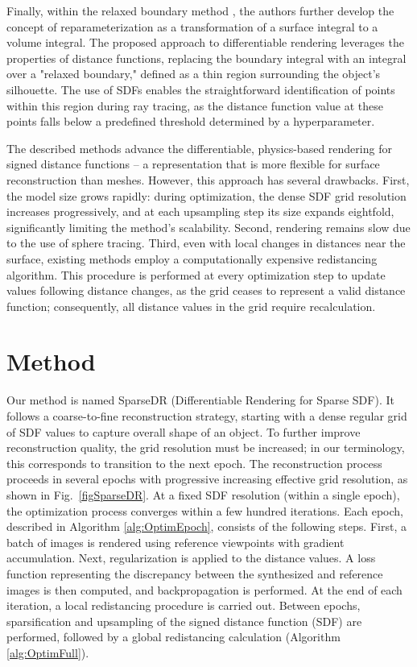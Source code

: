 \documentclass{ieeeaccess}
\begin{document}
Finally, within the relaxed boundary method \cite{RelaxBoundary}, the authors further develop the concept of reparameterization as a transformation of a surface integral to a volume integral. The proposed approach to differentiable rendering leverages the properties of distance functions, replacing the boundary integral with an integral over a "relaxed boundary," defined as a thin region surrounding the object's silhouette. The use of SDFs enables the straightforward identification of points within this region during ray tracing, as the distance function value at these points falls below a predefined threshold determined by a hyperparameter.

The described methods advance the differentiable, physics-based rendering for signed distance functions -- a representation that is more flexible for surface reconstruction than meshes. However, this approach has several drawbacks. First, the model size grows rapidly: during optimization, the dense SDF grid resolution increases progressively, and at each upsampling step its size expands eightfold, significantly limiting the method's scalability. Second, rendering remains slow due to the use of sphere tracing. Third, even with local changes in distances near the surface, existing methods employ a computationally expensive redistancing algorithm. This procedure is performed at every optimization step to update values following distance changes, as the grid ceases to represent a valid distance function; consequently, all distance values in the grid require recalculation.

\section{Method}

Our method is named SparseDR (Differentiable Rendering for Sparse SDF). It follows a coarse-to-fine reconstruction strategy, starting with a dense regular grid of SDF values to capture overall shape of an object. To further improve reconstruction quality, the grid resolution must be increased; in our terminology, this corresponds to transition to the next epoch. The reconstruction process proceeds in several epochs with progressive increasing effective grid resolution, as shown in Fig.~\ref{figSparseDR}. At a fixed SDF resolution (within a single epoch), the optimization process converges within a few hundred iterations. Each epoch, described in Algorithm \ref{alg:OptimEpoch}, consists of the following steps. First, a batch of images is rendered using reference viewpoints with gradient accumulation. Next, regularization is applied to the distance values. A loss function representing the discrepancy between the synthesized and reference images is then computed, and backpropagation is performed. At the end of each iteration, a local redistancing procedure is carried out. Between epochs, sparsification and upsampling of the signed distance function (SDF) are performed, followed by a global redistancing calculation (Algorithm \ref{alg:OptimFull}).
\end{document}
